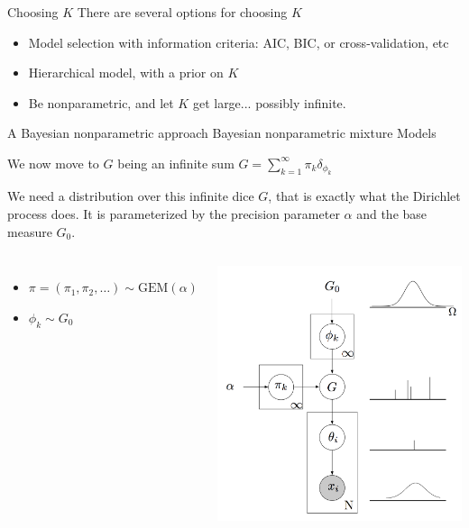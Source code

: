 \begin{frame}{Choosing $K$}
There are several options for choosing $K$
\begin{itemize}
	\item Model selection with information criteria: AIC, BIC, or cross-validation, etc
	\item Hierarchical model, with a prior on $K$
	\item Be nonparametric, and let $K$ get large... possibly infinite.
\end{itemize}
	
\end{frame}



\begin{frame}{A {Bayesian nonparametric} approach}
	 \alert{Bayesian nonparametric}   mixture Models
	 
	 We now move to $G$ being an infinite sum $G = \sum_{k=1}^\infty \pi_k \delta_{\phi_k}$ 
	
We need a distribution over this infinite dice $G$, that is exactly what the \alert{Dirichlet process} does. It is parameterized by the precision parameter $\alpha$ and the base measure $G_0$.

\begin{columns}
\begin{itemize}
	\item $\pi = (\pi_1,\pi_2,\ldots)\sim \text{GEM}(\alpha)$
	\item $\phi_k\sim G_0$
\end{itemize}

\begin{center}
		\includegraphics[height=.4\textheight]{figures_julyan/mixtures/plate_SB_mixture}
\end{center}
\end{columns}
\end{frame}



